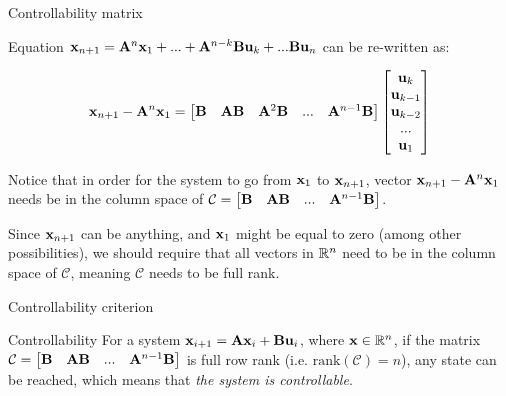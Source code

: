 \documentclass{beamer}
\begin{document}
\begin{frame}{Controllability matrix}
\begin{flushleft}

Equation $\mathbf{x}_{n+1} = \mathbf{A}^n \mathbf{x}_1 + ... 
+ \mathbf{A}^{n - k} \mathbf{B} \mathbf{u}_{k} + ...
\mathbf{B} \mathbf{u}_n$ can be re-written as:

\begin{equation}
    \mathbf{x}_{n+1} - \mathbf{A}^n \mathbf{x}_1 = 
    \begin{bmatrix}
    \mathbf{B} &
    \mathbf{A} \mathbf{B} &
    \mathbf{A}^2 \mathbf{B} & ... &
    \mathbf{A}^{n - 1} \mathbf{B}
    \end{bmatrix}    
    \begin{bmatrix}
    \mathbf{u}_{k} \\
    \mathbf{u}_{k-1} \\
    \mathbf{u}_{k-2} \\ ... \\
    \mathbf{u}_{1}
    \end{bmatrix}
\end{equation}

Notice that in order for the system to go from $\mathbf{x}_1$ to $\mathbf{x}_{n+1}$, vector $\mathbf{x}_{n+1} - \mathbf{A}^n \mathbf{x}_1$ needs be in the column space of $\mathcal{C} = \begin{bmatrix}
    \mathbf{B} &
    \mathbf{A} \mathbf{B} & ... &
    \mathbf{A}^{n - 1} \mathbf{B}
    \end{bmatrix}$.

Since $\mathbf{x}_{n+1}$ can be anything, and $\mathbf{x}_1$ might be equal to zero (among other possibilities), we should require that all vectors in $\mathbb{R}^n$ need to be in the column space of $\mathcal{C}$, meaning $\mathcal{C}$ needs to be full rank.

\end{flushleft}
\end{frame}


\begin{frame}{Controllability criterion}
\begin{flushleft}

\begin{block}{Controllability}
For a system $\mathbf{x}_{i+1} = \mathbf{A}  \mathbf{x}_i + \mathbf{B} \mathbf{u}_i$, where $\mathbf{x} \in \mathbb{R}^n$, if the matrix $\mathcal{C} = \begin{bmatrix}
    \mathbf{B} &
    \mathbf{A} \mathbf{B} & ... &
    \mathbf{A}^{n - 1} \mathbf{B}
    \end{bmatrix}$ is full row rank (i.e. $\text{rank}(\mathcal{C}) = n$), any state can be reached, which means that \emph{the system is controllable}.
\end{block}

\end{flushleft}
\end{frame}
\end{document}
